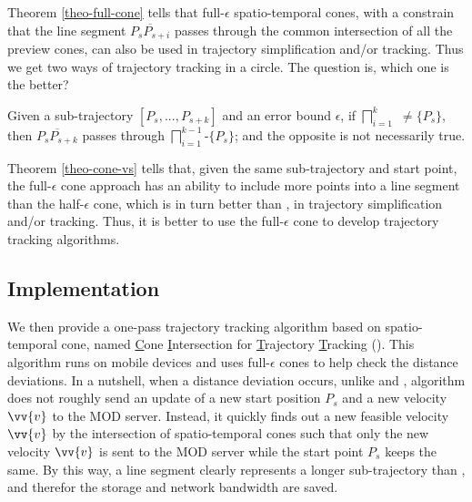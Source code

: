 Theorem \ref{theo-full-cone} tells that full-$\epsilon$ spatio-temporal cones, with a constrain that the line segment $\overline{P_sP_{s+i}}$ passes through the common intersection of all the preview cones, can also be used in trajectory simplification and/or tracking. Thus we get two ways of trajectory tracking in a circle. The question is, which one is the better?

\begin{theorem}
	\label{theo-cone-vs}
	Given a sub-trajectory $[P_s,...,P_{s+k}]$ and an error bound $\epsilon$, if $\bigsqcap_{i=1}^{k}$ $\ne \{P_s\}$, then $\overline{P_sP_{s+k}}$ passes through $\bigsqcap_{i=1}^{k-1}$-$\{P_s\}$; and the opposite is not necessarily true.
\end{theorem}


Theorem \ref{theo-cone-vs} tells that, given the same sub-trajectory and start point, the full-$\epsilon$ cone approach has an ability to include more points into a line segment than the half-$\epsilon$ cone, which is in turn better than \ldrh, in trajectory simplification and/or tracking. Thus, it is better to use the full-$\epsilon$ cone to develop trajectory tracking algorithms.

\subsection{Implementation}
We then provide a one-pass trajectory tracking algorithm based on spatio-temporal cone, named \underline{C}one \underline{I}ntersection for \underline{T}rajectory \underline{T}racking (\citt). This algorithm runs on mobile devices and uses full-$\epsilon$ cones to help check the distance deviations. In a nutshell, when a distance deviation occurs, unlike \ldr and \ldrh, algorithm \citt does not roughly send an update of a new start position $P_s$ and a new velocity $\vv{v}$ to the MOD server. Instead, it quickly finds out a new feasible velocity $\vv{v}$ by the intersection of spatio-temporal cones such that only the new velocity $\vv{v}$ is sent to the MOD server while the start point $P_s$ keeps the same. By this way, a line segment clearly represents a longer sub-trajectory than \ldrh, and therefor the storage and network bandwidth are saved.

